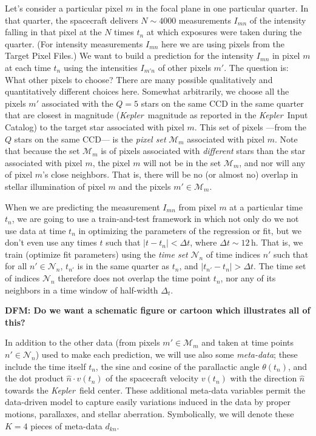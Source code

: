 \documentclass[12pt, preprint]{aastex}
\newcommand{\project}[1]{\textsl{#1}}
\newcommand{\Kepler}{\project{Kepler}}
\newcommand{\set}[1]{\mathcal{#1}}
\newcommand{\todo}[1]{\textbf{#1}}
\begin{document}
Let's consider a particular pixel $m$ in the focal plane in one particular quarter.
In that quarter, the spacecraft delivers $N\sim 4000$ measurements $I_{mn}$
  of the intensity falling in that pixel at the $N$ times $t_n$ at which exposures were taken during the quarter.
(For intensity measurements $I_{mn}$ here we are using pixels from the Target Pixel Files.)
We want to build a prediction for the intensity $I_{mn}$ in pixel $m$ at each time $t_n$
  using the intensities $I_{m'n}$ of other pixels $m'$.
The question is:  What other pixels to choose?
There are many possible qualitatively and quantitatively different choices here.
Somewhat arbitrarily,
  we choose all the pixels $m'$ associated with the $Q=5$ stars on the same CCD in the same quarter
  that are closest in magnitude
  (\Kepler\ magnitude as reported in the \Kepler\ Input Catalog)
  to the target star associated with pixel $m$.
This set of pixels%
  ---from the $Q$ stars on the same CCD---%
  is the \emph{pixel set} $\set{M}_m$ associated with pixel $m$.
Note that because the set $\set{M}_m$ is of pixels associated with \emph{different} stars
  than the star associated with pixel $m$,
  the pixel $m$ will not be in the set $\set{M}_m$,
  and nor will any of pixel $m$'s close neighbors.
That is, there will be no (or almost no) overlap in stellar illumination of pixel $m$
  and the pixels $m'\in\set{M}_m$.

When we are predicting the measurement $I_{mn}$ from pixel $m$ at a particular time $t_n$,
  we are going to use a train-and-test framework in which not only do we not use
  data at time $t_n$ in optimizing the parameters of the regression or fit,
  but we don't even use any times $t$ such that $|t-t_n| < \Delta t$,
  where $\Delta t\sim 12$\,h.
That is, we train (optimize fit parameters) using the \emph{time set} $\set{N}_n$ of time
  indices $n'$ such that for all $n'\in\set{N}_n$,
  $t_{n'}$ is in the same quarter as $t_n$,
  and $|t_{n'} - t_n|>\Delta t$.
The time set of indices $\set{N}_n$ therefore does not overlap the time point $t_n$,
  nor any of its neighbors in a time window of half-width $\Delta_t$.

\todo{DFM: Do we want a schematic figure or cartoon which illustrates all of this?}

In addition to the other data (from pixels $m'\in\set{M}_m$ and taken at time points $n'\in\set{N}_n$)
  used to make each prediction, we will use also some \emph{meta-data};
  these include the time itself $t_n$,
  the sine and cosine of the parallactic angle $\theta(t_n)$,
  and the dot product $\hat{n}\cdot v(t_n)$ of the spacecraft velocity $v(t_n)$
  with the direction $\hat{n}$ towards the \Kepler\ field center.
These additional meta-data variables permit the data-driven model
  to capture easily variations induced in the data
  by proper motions, parallaxes, and stellar aberration.
Symbolically, we will denote these $K=4$ pieces of meta-data $d_{kn}$.
\end{document}
